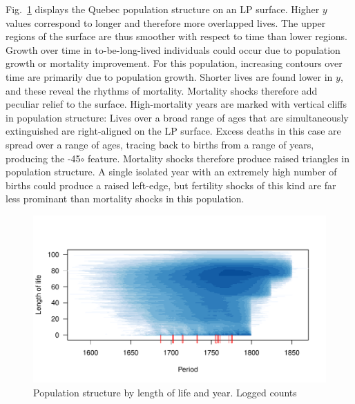 Fig.~\ref{fig:lpq} displays the Quebec population structure on an LP surface.
Higher $y$ values correspond to longer and therefore more overlapped lives. The
upper regions of the surface are thus smoother with respect to time than lower
regions. Growth over time in to-be-long-lived individuals could occur due to
population growth or mortality improvement. For this population, increasing contours over time are primarily
due to population growth. Shorter lives are found lower in $y$, and these reveal
the rhythms of mortality. Mortality
shocks therefore add peculiar relief to the surface. High-mortality years are
marked with vertical cliffs in population structure: Lives over a broad range of
ages that are simultaneously extinguished are right-aligned on the LP surface.
Excess deaths in this case are spread over a range of ages, tracing back to
births from a range of years, producing the -45$\circ$ feature. Mortality shocks
therefore produce raised triangles in population structure. A single
isolated year with an extremely high number of births could produce a raised
left-edge, but fertility shocks of this kind are far less prominant than
mortality shocks in this population.


\begin{figure}
\centering
\includegraphics[scale=.9]{Figures/QuebecLP.pdf}
\caption{Population structure by length of life and year. Logged counts}
\label{fig:lpq}
\end{figure}

